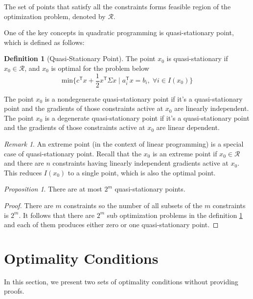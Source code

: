 \documentclass[letterpaper, oneside]{book}
\theoremstyle{definition}
\newtheorem{definition}{Definition}[chapter]
\theoremstyle{remark}
\newtheorem*{remark}{Remark}
\newtheorem{prop}{Proposition}[chapter]
\begin{document}
The set of points that satisfy all the constraints forms feasible region of the optimization problem, denoted by $\mathcal{R}$.

One of the key concepts in quadratic programming is quasi-stationary point, which is defined as follows:

\begin{definition}[Quasi-Stationary Point]\label{def_quasi_stationary_point}
	The point $x_0$ is quasi-stationary if $x_0\in \mathcal{R}$, and $x_0$ is optimal for the problem below
	\begin{displaymath}
		\textrm{min}\{c^{\mathsf{T}}x + \frac{1}{2}x^{\mathsf{T}}\Sigma{}x \;|\; a_i^{\mathsf{T}}x=b_i, \;\forall i \in I(x_0)  \}
	\end{displaymath}
\end{definition}

The point $x_0$ is a nondegenerate quasi-stationary point if it's a quasi-stationary point and the gradients of those constraints active at $x_0$ are linearly independent. The point $x_0$ is a degenerate quasi-stationary point if it's a quasi-stationary point and the gradients of those constraints active at $x_0$ are linear dependent.

\begin{remark}
	An extreme point (in the context of linear programming) is a special case of quasi-stationary point. Recall that the $x_0$ is an extreme point if $x_0 \in \mathcal{R}$ and there are $n$ constraints having linearly independent gradients active at $x_0$. This reduces $I(x_0)$ to a single point, which is also the optimal point.
\end{remark}
\begin{prop}
	There are at most $2^m$ quasi-stationary points.
\end{prop}

\begin{proof}
	There are $m$ constraints so the number of all subsets of the $m$ constraints is $2^m$. It follows that there are $2^m$ sub optimization problems in the definition \ref{def_quasi_stationary_point} and each of them produces either zero or one quasi-stationary point.
\end{proof}



\section{Optimality Conditions}

In this section, we present two sets of optimality conditions without providing proofs. 
\end{document}
